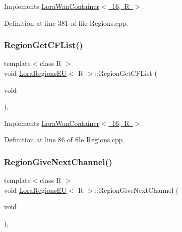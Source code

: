 Implements \mbox{\hyperlink{class_lora_wan_container_ab68ac169b3edd9aacc7a9c40976dc231}{Lora\+Wan\+Container$<$ 16, R $>$}}.



Definition at line 381 of file Regions.\+cpp.

\mbox{\label{class_lora_regions_e_u_acdbe1d2f767912fac7edf295961dfb6b}} 
\subsubsection{\texorpdfstring{Region\+Get\+C\+F\+List()}{RegionGetCFList()}}
{\footnotesize\ttfamily template$<$class R $>$ \\
void \mbox{\hyperlink{class_lora_regions_e_u}{Lora\+Regions\+EU}}$<$ R $>$\+::Region\+Get\+C\+F\+List (\begin{DoxyParamCaption}\item[{void}]{ }\end{DoxyParamCaption})\hspace{0.3cm}{\ttfamily [protected]}, {\ttfamily [virtual]}}



Implements \mbox{\hyperlink{class_lora_wan_container_a6603ef368fea1cf2d1e4de2120c1dff6}{Lora\+Wan\+Container$<$ 16, R $>$}}.



Definition at line 86 of file Regions.\+cpp.

\mbox{\label{class_lora_regions_e_u_adf5f39b2b13ad1dca0eccb80123c261d}} 
\subsubsection{\texorpdfstring{Region\+Give\+Next\+Channel()}{RegionGiveNextChannel()}}
{\footnotesize\ttfamily template$<$class R $>$ \\
void \mbox{\hyperlink{class_lora_regions_e_u}{Lora\+Regions\+EU}}$<$ R $>$\+::Region\+Give\+Next\+Channel (\begin{DoxyParamCaption}\item[{void}]{ }\end{DoxyParamCaption})\hspace{0.3cm}{\ttfamily [protected]}, {\ttfamily [virtual]}}



